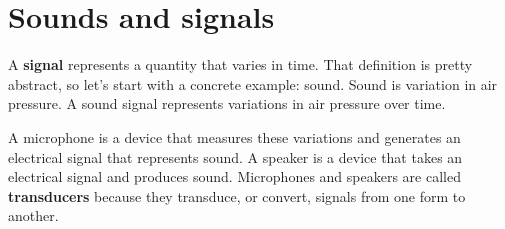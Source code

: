 \documentclass[12pt]{book}
\begin{document}












\normalsize

\clearemptydoublepage

\begin{latexonly}

\tableofcontents

\clearemptydoublepage

\end{latexonly}

\mainmatter


\chapter{Sounds and signals}
\label{sounds}

A {\bf signal} represents a quantity that varies in time.  That
definition is pretty abstract, so let's start with a concrete example:
sound.  Sound is variation in air pressure.  A sound signal represents
variations in air pressure over time.

A microphone is a device that measures these variations and generates
an electrical signal that represents sound.  A speaker is a device
that takes an electrical signal and produces sound.
Microphones and speakers are called {\bf transducers} because they
transduce, or convert, signals from one form to another.
\end{document}

